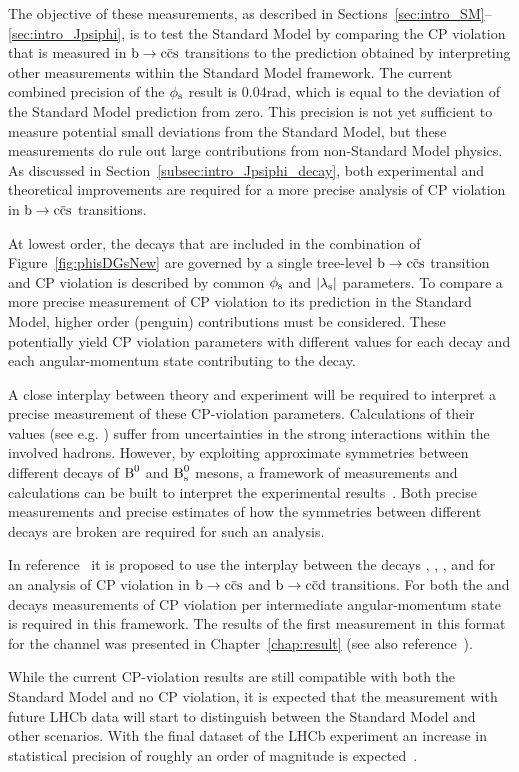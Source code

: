 The objective of these measurements, as described in Sections~\ref{sec:intro_SM}--\ref{sec:intro_Jpsiphi}, is to test the Standard Model by
comparing the CP violation that is measured in $\btoccs$ transitions to the prediction obtained by interpreting other measurements within
the Standard Model framework. The current combined precision of the $\phi_\text{s}$ result is 0.04\unitsp{}rad, which is equal to the deviation of
the Standard Model prediction from zero. This precision is not yet sufficient to measure potential small deviations from the Standard
Model, but these measurements do rule out large contributions from non-Standard Model physics. As discussed in
Section~\ref{subsec:intro_Jpsiphi_decay}, both experimental and theoretical improvements are required for a more precise analysis of CP
violation in $\btoccs$ transitions.

At lowest order, the decays that are included in the combination of Figure~\ref{fig:phisDGsNew} are governed by a single tree-level
$\btoccs$ transition and CP violation is described by common $\phi_\text{s}$ and $|{\lambda_{\text{s}}}|$ parameters. To compare a more precise measurement of CP
violation to its prediction in the Standard Model, higher order (penguin) contributions must be considered. These potentially yield CP
violation parameters with different values for each decay and each angular-momentum state contributing to the \BstoJpsiKK{} decay.

A close interplay between theory and experiment will be required to interpret a precise measurement of these CP-violation parameters.
Calculations of their values (see e.g. \cite{Liu:2013nea}) suffer from uncertainties in the strong interactions within the involved
hadrons. However, by exploiting approximate symmetries between different decays of $\text{B}^\text{0}$ and $\text{B}_\text{s}^\text{0}$ mesons, a framework of measurements
and calculations can be built to interpret the experimental results~\cite{Faller:2008gt,DeBruyn:2014oga}. Both precise measurements and
precise estimates of how the symmetries between different decays are broken are required for such an analysis.

In reference~\cite{DeBruyn:2014oga} it is proposed to use the interplay between the decays \BstoJpsiphi, \BstoJpsiKS, \BdtoJpsiKS, and
\BdtoJpsirho{} for an analysis of CP violation in $\btoccs$ and $\btoccd$ transitions. For both the \BstoJpsiphi{} and \BdtoJpsirho{}
decays measurements of CP violation per intermediate angular-momentum state is required in this framework. The results of the first
measurement in this format for the \BstoJpsiphi{} channel was presented in Chapter~\ref{chap:result} (see also
reference~\cite{LHCb-PAPER-2014-059}).

While the current CP-violation results are still compatible with both the Standard Model and no CP violation, it is expected that the
measurement with future LHCb data will start to distinguish between the Standard Model and other scenarios. With the final dataset of the
LHCb experiment an increase in statistical precision of roughly an order of magnitude is
expected~\cite{CERN-LHCC-2011-001,LHCB-PAPER-2012-031}.


